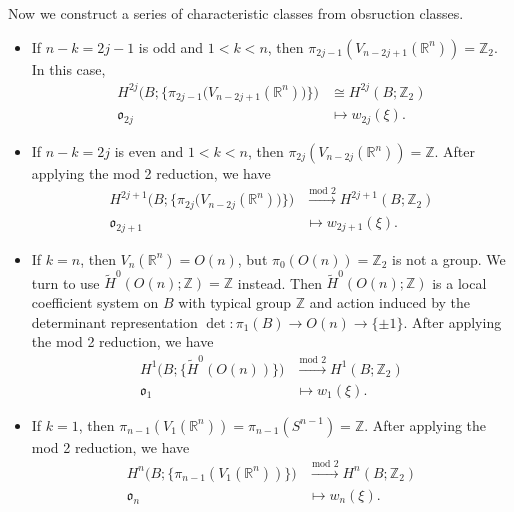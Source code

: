 \documentclass[12pt,a4paper]{article}
\theoremstyle{definition}
\newcommand{\mZ}{\mathbb{Z}}
\newcommand{\mR}{\mathbb{R}}
\begin{document}
Now we construct a series of characteristic classes from obsruction classes. 
\begin{itemize}
    \item If $n-k=2j-1$ is odd and $1<k<n$, then 
    $\pi_{2j-1}(V_{n-2j+1}(\mR^n)) = \mZ_2$. In this case, 
    \begin{align*}
        H^{2j}\Big(B;\big\{\pi_{2j-1}\big(V_{n-2j+1}(\mR^n)\big)\big\}\Big)
        &\cong H^{2j}(B;\mZ_2) \\ 
        \mathfrak{o}_{2j} &\mapsto w_{2j}(\xi).
    \end{align*}
    \item If $n-k=2j$ is even and $1<k<n$, then 
    $\pi_{2j}(V_{n-2j}(\mR^n)) = \mZ$. After applying the mod 2 reduction, 
    we have 
    \begin{align*}
        H^{2j+1}\Big(B;\big\{\pi_{2j}\big(V_{n-2j}(\mR^n)\big)\big\}\Big)
        &\xrightarrow{\text{mod } 2} H^{2j+1}(B;\mZ_2) \\ 
        \mathfrak{o}_{2j+1} &\mapsto w_{2j+1}(\xi).
    \end{align*}
    \item If $k=n$, then $V_n(\mR^n) = O(n)$, but $\pi_0(O(n)) = \mZ_2$ is 
    not a group. We turn to use $\tilde{H}^0(O(n);\mZ) = \mZ$ instead. Then 
    $\tilde{H}^0(O(n);\mZ)$ is a local coefficient system on $B$ with typical 
    group $\mZ$ and action induced by the determinant representation 
    $\det:\pi_1(B)\to O(n)\to \{\pm 1\}$. After applying the mod 2 reduction, 
    we have
    \begin{align*}
        H^1\Big(B;\big\{\tilde{H}^0(O(n))\big\}\Big)
        &\xrightarrow{\text{mod } 2} H^1(B;\mZ_2) \\ 
        \mathfrak{o}_1 &\mapsto w_1(\xi).
    \end{align*}
    \item If $k=1$, then $\pi_{n-1}(V_1(\mR^n)) = \pi_{n-1}(S^{n-1}) = \mZ$.
    After applying the mod 2 reduction, we have
    \begin{align*}
        H^n\Big(B;\big\{\pi_{n-1}(V_1(\mR^n))\big\}\Big)
        &\xrightarrow{\text{mod } 2} H^n(B;\mZ_2) \\ 
        \mathfrak{o}_n &\mapsto w_n(\xi).
    \end{align*}
\end{itemize}
\end{document}

